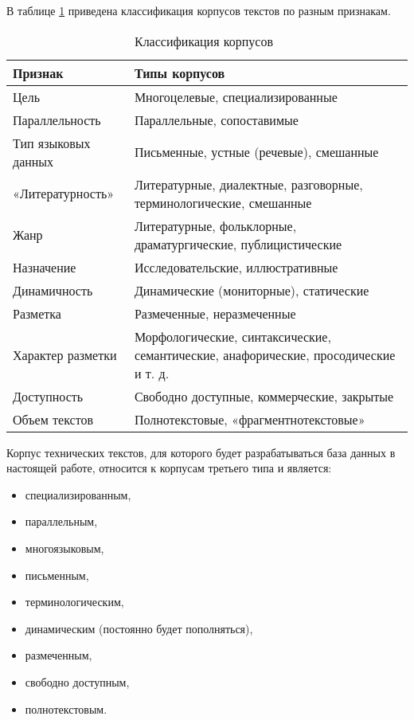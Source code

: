 В таблице \ref{tab:cc} приведена классификация корпусов текстов по разным признакам.

\begin{table}[H]
    \centering
    \begin{tabular}{|p{5cm}|p{11cm}|}
        \hline
        \textbf{Признак} & \textbf{Типы корпусов} \\ \hline
        Цель & Многоцелевые, специализированные \\ \hline
        Параллельность & Параллельные, сопоставимые \\ \hline
        Тип языковых данных & Письменные, устные (речевые), смешанные \\ \hline
        «Литературность» & Литературные, диалектные, разговорные, терминологические, смешанные \\ \hline
        Жанр & Литературные, фольклорные, драматургические, публицистические \\ \hline
        Назначение & Исследовательские, иллюстративные \\ \hline
        Динамичность & Динамические (мониторные), статические \\ \hline
        Разметка & Размеченные, неразмеченные \\ \hline
        Характер разметки & Морфологические, синтаксические, семантические, анафорические, просодические и т. д. \\ \hline
        Доступность & Свободно доступные, коммерческие, закрытые \\ \hline
        Объем текстов & Полнотекстовые, «фрагментнотекстовые» \\ \hline
    \end{tabular}
    \caption{Классификация корпусов~\cite[с. 57]{cl2022}}
    \label{tab:cc}
\end{table}

Корпус технических текстов, для которого будет разрабатываться база данных в настоящей работе, относится к корпусам третьего типа и является:
\begin{itemize}
    \item специализированным,
    \item параллельным,
    \item многоязыковым,
    \item письменным,
    \item терминологическим,
    \item динамическим (постоянно будет пополняться),
    \item размеченным,
    \item свободно доступным,
    \item полнотекстовым.
\end{itemize}

